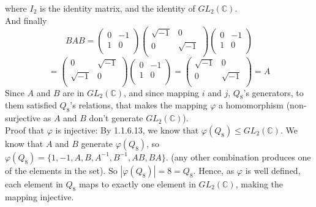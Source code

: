 \documentclass{article}
\newcommand{\C}{\mathbb{C}}
\begin{document}
    where $I_2$ is the identity matrix,
    and the identity of $GL_2(\C)$. \\
    And finally
    \[  BAB = \begin{pmatrix}
        0 & -1 \\
        1 & 0 \\
    \end{pmatrix}
    \begin{pmatrix}
        \sqrt{-1} & 0 \\
        0 & \sqrt{-1} \\
    \end{pmatrix}
    \begin{pmatrix}
        0 & -1 \\
        1 & 0 \\
    \end{pmatrix} \]
    \[ = \begin{pmatrix}
        0 & \sqrt{-1} \\
        \sqrt{-1} & 0 \\
    \end{pmatrix}
    \begin{pmatrix}
        0 & -1 \\
        1 & 0 \\
    \end{pmatrix}
    = \begin{pmatrix}
        \sqrt{-1} & 0 \\
        0 & \sqrt{-1} \\
    \end{pmatrix} = A \]
    Since $A$ and $B$ are in $GL_2(\C)$,
    and since mapping $i$ and $j$, $Q_8$'s generators, to them
    satisfied $Q_8$'s relations,
    that makes the mapping $\varphi$ a homomorphism
    (non-surjective as $A$ and $B$ don't generate $GL_2(\C)$). \\
    Proof that $\varphi$ is injective:
    By 1.1.6.13, we know that $\varphi(Q_8) \leqslant GL_2(\C)$.
    We know that $A$ and $B$ generate $\varphi(Q_8)$,
    so $\varphi(Q_8) = \{ 1, -1, A, B, A^{-1}, B^{-1}, AB, BA \}$.
    (any other combination produces one of the elements in the set).
    So $|\varphi(Q_8)| = 8 = Q_8$.
    Hence, as $\varphi$ is well defined, each element in $Q_8$
    maps to exactly one element in $GL_2(\C)$,
    making the mapping injective.
        
\end{document}
